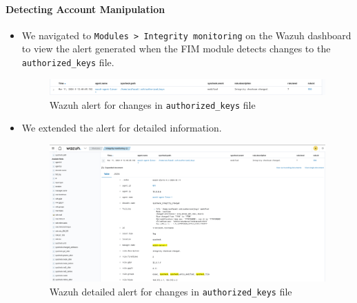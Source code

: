 \paragraph{Detecting Account Manipulation}
\begin{itemize}
    \item We navigated to \texttt{Modules > Integrity monitoring} on the Wazuh dashboard to view the alert generated when the FIM module detects changes to the \texttt{authorized\_keys} file.
          \begin{figure} [H]
              \centering
              \includegraphics[width=\textwidth]{images/fim/fim-11.png}
              \caption{Wazuh alert for changes in \texttt{authorized\_keys} file}
              \label{fig:fim-11}
          \end{figure}
    \item We extended the alert for detailed information.
          \begin{figure} [H]
              \centering
              \includegraphics[width=\textwidth]{images/fim/fim-12.png}
              \caption{Wazuh detailed alert for changes in \texttt{authorized\_keys} file}
              \label{fig:fim-12}
          \end{figure}

\end{itemize}

